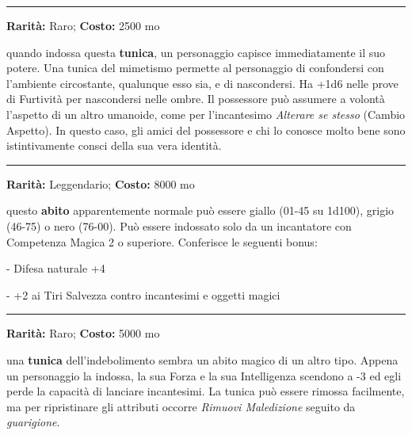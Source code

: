 \begin{multicols}{2}
\smallskip\noindent\rule{\linewidth}{2pt}  \hypertarget{TunicadelMimetismo}{}\medskip{}\noindent\label{TunicadelMimetismo}

\textbf{Rarità:} Raro; \textbf{Costo:} 2500 mo

quando indossa questa \textbf{tunica}, un personaggio capisce immediatamente il suo potere. Una tunica del mimetismo permette al personaggio di confondersi con l'ambiente circostante, qualunque esso sia, e di nascondersi. Ha +1d6 nelle prove di Furtività per nascondersi nelle ombre. Il possessore può assumere a volontà l'aspetto di un altro umanoide, come per l'incantesimo \emph{Alterare se stesso} (Cambio Aspetto). In questo caso, gli amici del possessore e chi lo conosce molto bene sono istintivamente consci della sua vera identità.

\smallskip\noindent\rule{\linewidth}{2pt}  \hypertarget{Tunicadell'Arcimago}{}\medskip{}\noindent\label{Tunicadell'Arcimago}

\textbf{Rarità:} Leggendario; \textbf{Costo:} 8000 mo

questo \textbf{abito} apparentemente normale può essere giallo (01-45 su 1d100), grigio (46-75) o nero (76-00). Può essere indossato solo da un incantatore con Competenza Magica 2 o superiore. Conferisce le seguenti bonus:

- Difesa naturale +4

- +2 ai Tiri Salvezza contro incantesimi e oggetti magici

\smallskip\noindent\rule{\linewidth}{2pt}  \hypertarget{Tunicadell'Indebolimento}{}\medskip{}\noindent\label{Tunicadell'Indebolimento}

\textbf{Rarità:} Raro; \textbf{Costo:} 5000 mo

una \textbf{tunica} dell'indebolimento sembra un abito magico di un altro tipo. Appena un personaggio la indossa, la sua Forza e la sua Intelligenza scendono a -3 ed egli perde la capacità di lanciare incantesimi. La tunica può essere rimossa facilmente, ma per ripristinare gli attributi occorre \emph{Rimuovi Maledizione} seguito da \emph{guarigione}.


\end{multicols}
